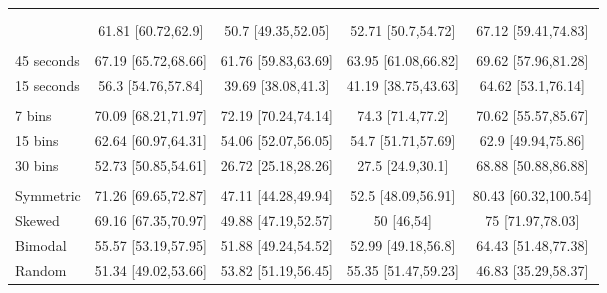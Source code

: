 
\begin{tabular}[t]{lcccc}
\toprule
{} &  &  &  &  \\
\cmidrule(l{3pt}r{3pt}){2-2} \cmidrule(l{3pt}r{3pt}){3-3} \cmidrule(l{3pt}r{3pt}){4-4} \cmidrule(l{3pt}r{3pt}){5-5}
\addlinespace[0.3em]
\\
\hspace{1em} & 61.81 [60.72,62.9] & 50.7 [49.35,52.05] & 52.71 [50.7,54.72] & 67.12 [59.41,74.83]\\
\addlinespace[0.3em]
\\
\hspace{1em}45 seconds & 67.19 [65.72,68.66] & 61.76 [59.83,63.69] & 63.95 [61.08,66.82] & 69.62 [57.96,81.28]\\
\hspace{1em}15 seconds & 56.3 [54.76,57.84] & 39.69 [38.08,41.3] & 41.19 [38.75,43.63] & 64.62 [53.1,76.14]\\
\addlinespace[0.3em]
\\
\hspace{1em}7 bins & 70.09 [68.21,71.97] & 72.19 [70.24,74.14] & 74.3 [71.4,77.2] & 70.62 [55.57,85.67]\\
\hspace{1em}15 bins & 62.64 [60.97,64.31] & 54.06 [52.07,56.05] & 54.7 [51.71,57.69] & 62.9 [49.94,75.86]\\
\hspace{1em}30 bins & 52.73 [50.85,54.61] & 26.72 [25.18,28.26] & 27.5 [24.9,30.1] & 68.88 [50.88,86.88]\\
\addlinespace[0.3em]
\\
\hspace{1em}Symmetric & 71.26 [69.65,72.87] & 47.11 [44.28,49.94] & 52.5 [48.09,56.91] & 80.43 [60.32,100.54]\\
\hspace{1em}Skewed & 69.16 [67.35,70.97] & 49.88 [47.19,52.57] & 50 [46,54] & 75 [71.97,78.03]\\
\hspace{1em}Bimodal & 55.57 [53.19,57.95] & 51.88 [49.24,54.52] & 52.99 [49.18,56.8] & 64.43 [51.48,77.38]\\
\hspace{1em}Random & 51.34 [49.02,53.66] & 53.82 [51.19,56.45] & 55.35 [51.47,59.23] & 46.83 [35.29,58.37]\\
\bottomrule
\end{tabular}
